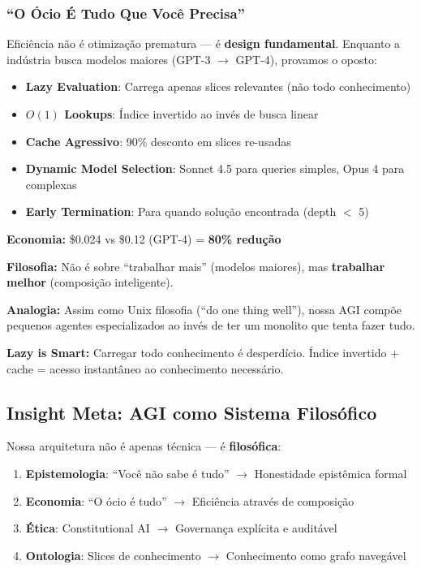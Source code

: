 \documentclass[11pt]{article}
\begin{document}
\subsubsection{``O Ócio É Tudo Que Você Precisa''}

Eficiência não é otimização prematura --- é \textbf{design fundamental}. Enquanto a indústria busca modelos maiores (GPT-3 $\rightarrow$ GPT-4), provamos o oposto:

\begin{itemize}
    \item \textbf{Lazy Evaluation}: Carrega apenas slices relevantes (não todo conhecimento)
    \item \textbf{$O(1)$ Lookups}: Índice invertido ao invés de busca linear
    \item \textbf{Cache Agressivo}: 90\% desconto em slices re-usadas
    \item \textbf{Dynamic Model Selection}: Sonnet 4.5 para queries simples, Opus 4 para complexas
    \item \textbf{Early Termination}: Para quando solução encontrada (depth $<$ 5)
\end{itemize}

\textbf{Economia:} \$0.024 vs \$0.12 (GPT-4) = \textbf{80\% redução}

\textbf{Filosofia:} Não é sobre ``trabalhar mais'' (modelos maiores), mas \textbf{trabalhar melhor} (composição inteligente).

\textbf{Analogia:} Assim como Unix filosofia (``do one thing well''), nossa AGI compõe pequenos agentes especializados ao invés de ter um monolito que tenta fazer tudo.

\textbf{Lazy is Smart:} Carregar todo conhecimento é desperdício. Índice invertido + cache = acesso instantâneo ao conhecimento necessário.

\subsection{Insight Meta: AGI como Sistema Filosófico}

Nossa arquitetura não é apenas técnica --- é \textbf{filosófica}:

\begin{enumerate}
    \item \textbf{Epistemologia}: ``Você não sabe é tudo'' $\rightarrow$ Honestidade epistêmica formal
    \item \textbf{Economia}: ``O ócio é tudo'' $\rightarrow$ Eficiência através de composição
    \item \textbf{Ética}: Constitutional AI $\rightarrow$ Governança explícita e auditável
    \item \textbf{Ontologia}: Slices de conhecimento $\rightarrow$ Conhecimento como grafo navegável
\end{enumerate}
\end{document}

